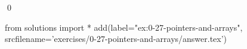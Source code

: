 
\begin{ex}
  \label{ex:0-27-pointers-and-arrays}
  
  \qed
\end{ex}
\begin{python0}
from solutions import *
add(label="ex:0-27-pointers-and-arrays",
    srcfilename='exercises/0-27-pointers-and-arrays/answer.tex')
\end{python0}
